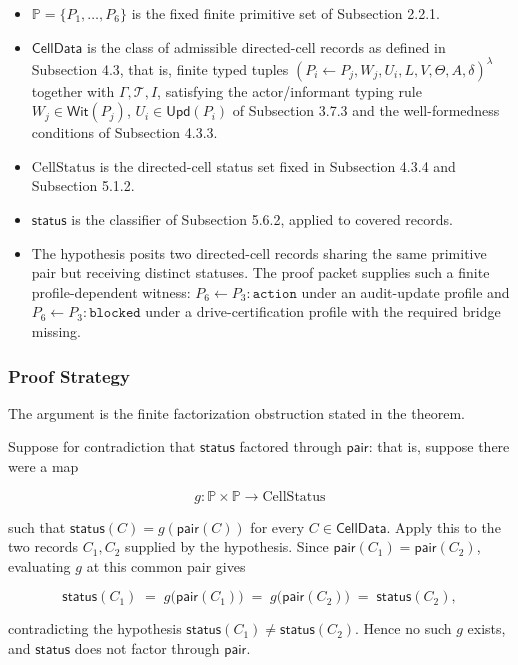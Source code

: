\documentclass[11pt]{article}
\providecommand{\tightlist}{}
\theoremstyle{definition}
\begin{document}
\begin{itemize}
\tightlist
\item
  \(\mathbb P=\{P_1,\ldots,P_6\}\) is the fixed finite primitive set of Subsection 2.2.1.
\item
  \(\mathsf{CellData}\) is the class of admissible directed-cell records as defined in Subsection 4.3, that is, finite typed tuples \((P_i\leftarrow P_j,W_j,U_i,L,V,\Theta,A,\delta)^{\lambda}\) together with \(\Gamma,\mathcal T,I\), satisfying the actor/informant typing rule \(W_j\in\mathsf{Wit}(P_j)\), \(U_i\in\mathsf{Upd}(P_i)\) of Subsection 3.7.3 and the well-formedness conditions of Subsection 4.3.3.
\item
  \(\mathrm{CellStatus}\) is the directed-cell status set fixed in Subsection 4.3.4 and Subsection 5.1.2.
\item
  \(\mathsf{status}\) is the classifier of Subsection 5.6.2, applied to covered records.
\item
  The hypothesis posits two directed-cell records sharing the same primitive pair but receiving distinct statuses. The proof packet supplies such a finite profile-dependent witness: \(P_6\leftarrow P_3:\texttt{action}\) under an audit-update profile and \(P_6\leftarrow P_3:\texttt{blocked}\) under a drive-certification profile with the required bridge missing.
\end{itemize}

\subsubsection{Proof Strategy}

The argument is the finite factorization obstruction stated in the theorem.

Suppose for contradiction that \(\mathsf{status}\) factored through \(\mathsf{pair}\): that is, suppose there were a map

\[
g\colon\mathbb P\times\mathbb P\to\mathrm{CellStatus}
\]

such that \(\mathsf{status}(C)=g(\mathsf{pair}(C))\) for every \(C\in\mathsf{CellData}\). Apply this to the two records \(C_1,C_2\) supplied by the hypothesis. Since \(\mathsf{pair}(C_1)=\mathsf{pair}(C_2)\), evaluating \(g\) at this common pair gives

\[
\mathsf{status}(C_1)\;=\;g\bigl(\mathsf{pair}(C_1)\bigr)\;=\;g\bigl(\mathsf{pair}(C_2)\bigr)\;=\;\mathsf{status}(C_2),
\]

contradicting the hypothesis \(\mathsf{status}(C_1)\neq\mathsf{status}(C_2)\). Hence no such \(g\) exists, and \(\mathsf{status}\) does not factor through \(\mathsf{pair}\).
\end{document}
